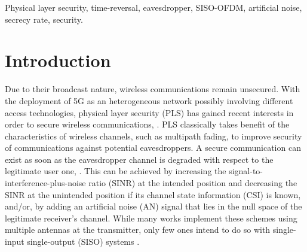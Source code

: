 \documentclass[conference]{IEEEtran}
\begin{document}
\begin{IEEEkeywords}
Physical layer security, time-reversal, eavesdropper, SISO-OFDM, artificial noise, secrecy rate, security. 
\end{IEEEkeywords}



\section{Introduction}
Due to their broadcast nature, wireless communications remain unsecured. With the  deployment of 5G as an heterogeneous network possibly involving different access technologies, physical layer security (PLS) has gained recent interests in order to secure wireless communications, \cite{PLS_litt1,PLS_litt2,PLS_litt3}. PLS classically takes benefit of the characteristics of wireless channels, such as multipath fading, to improve security of communications against potential eavesdroppers. A secure communication can exist as soon as the eavesdropper channel is degraded with respect to the legitimate user one, \cite{wyner}. This can be achieved by increasing the signal-to-interference-plus-noise ratio (SINR) at the intended position and decreasing the SINR at the unintended position if its channel state information (CSI) is known, and/or, by adding an artificial noise (AN) signal that lies in the null space of the legitimate receiver's channel. While many works implement these schemes using multiple antennas at the transmitter, only few ones intend to do so with single-input single-output (SISO) systems \cite{PLS_litt4,TR_FD_TD,TR_AN_2018_xu,TR_AN_2017_Li,TR_AN_2018_Li}.
\end{document}
